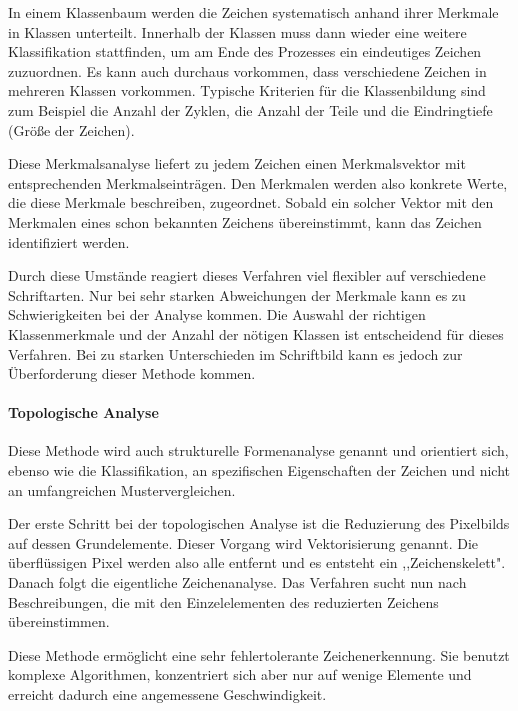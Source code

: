 
In einem Klassenbaum werden die Zeichen systematisch anhand ihrer Merkmale in Klassen unterteilt. Innerhalb der Klassen muss dann wieder eine weitere Klassifikation stattfinden, um am Ende des Prozesses ein eindeutiges Zeichen zuzuordnen. Es kann auch durchaus vorkommen, dass verschiedene Zeichen in mehreren Klassen vorkommen. Typische Kriterien für die Klassenbildung sind zum Beispiel die Anzahl der Zyklen, die Anzahl der Teile und die Eindringtiefe (Größe der Zeichen).

Diese Merkmalsanalyse liefert zu jedem Zeichen einen Merkmalsvektor mit entsprechenden Merkmalseinträgen. Den Merkmalen werden also konkrete Werte, die diese Merkmale beschreiben, zugeordnet. Sobald ein solcher Vektor mit den Merkmalen eines schon bekannten Zeichens übereinstimmt, kann das Zeichen identifiziert werden.

Durch diese Umstände reagiert dieses Verfahren viel flexibler auf verschiedene Schriftarten. Nur bei sehr starken Abweichungen der Merkmale kann es zu Schwierigkeiten bei der Analyse kommen. Die Auswahl der richtigen Klassenmerkmale und der Anzahl der nötigen Klassen ist entscheidend für dieses Verfahren. Bei zu starken Unterschieden im Schriftbild kann es jedoch zur Überforderung dieser Methode kommen.

\paragraph{Topologische Analyse}

Diese Methode wird auch strukturelle Formenanalyse genannt und orientiert sich, ebenso wie die Klassifikation, an spezifischen Eigenschaften der Zeichen und nicht an umfangreichen Mustervergleichen.

Der erste Schritt bei der topologischen Analyse ist die Reduzierung des Pixelbilds auf dessen Grundelemente. Dieser Vorgang wird Vektorisierung genannt. Die überflüssigen Pixel werden also alle entfernt und es entsteht ein ,,Zeichenskelett". Danach folgt die eigentliche Zeichenanalyse. Das Verfahren sucht nun nach Beschreibungen, die mit den Einzelelementen des reduzierten Zeichens übereinstimmen. 


Diese Methode ermöglicht eine sehr fehlertolerante Zeichenerkennung. Sie benutzt komplexe Algorithmen, konzentriert sich aber nur auf wenige Elemente und erreicht dadurch eine angemessene Geschwindigkeit.


